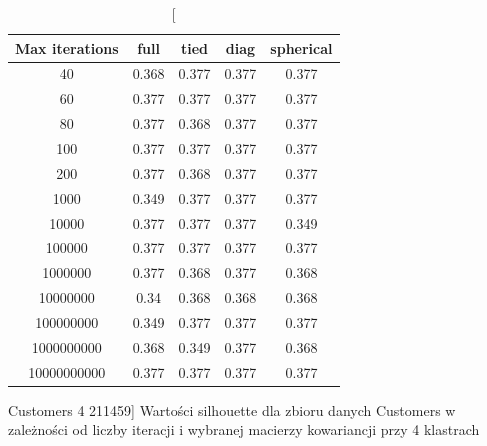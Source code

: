 \documentclass{classrep}
\begin{document}
{{            \begin{table}[!htbp]
                \begin{minipage}{1\textwidth}
                \centering
                \begin{tabular}{|c|c|c|c|c|}
                \hline
                Max iterations & full & tied & diag & spherical \\ \hline
                40 & 0.368 & 0.377 & 0.377 & 0.377 \\ \hline
                60 & 0.377 & 0.377 & 0.377 & 0.377 \\ \hline
                80 & 0.377 & 0.368 & 0.377 & 0.377 \\ \hline
                100 & 0.377 & 0.377 & 0.377 & 0.377 \\ \hline
                200 & 0.377 & 0.368 & 0.377 & 0.377 \\ \hline
                1000 & 0.349 & 0.377 & 0.377 & 0.377 \\ \hline
                10000 & 0.377 & 0.377 & 0.377 & 0.349 \\ \hline
                100000 & 0.377 & 0.377 & 0.377 & 0.377 \\ \hline
                1000000 & 0.377 & 0.368 & 0.377 & 0.368 \\ \hline
                10000000 & 0.34 & 0.368 & 0.368 & 0.368 \\ \hline
                100000000 & 0.349 & 0.377 & 0.377 & 0.377 \\ \hline
                1000000000 & 0.368 & 0.349 & 0.377 & 0.368 \\ \hline
                10000000000 & 0.377 & 0.377 & 0.377 & 0.377 \\ \hline
                \end{tabular}
                \caption
                [Customers 4 211459]
                {Wartości silhouette dla zbioru danych Customers w zależności od liczby
                iteracji i wybranej macierzy kowariancji przy 4 klastrach}
                \label{Customers_4_211459}
                \end{minipage}
                \hfill
                

\end{table}}}
\end{document}
